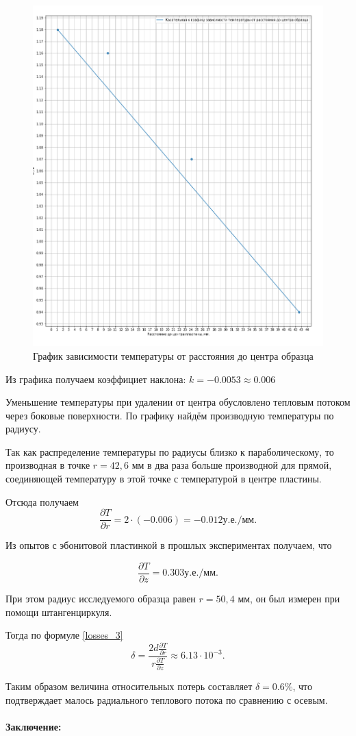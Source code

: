 \documentclass[a4paper, 12pt]{article}
\newcommand{\parag}[1]{\paragraph*{#1:}}
\begin{document}
\begin{figure}[h]
	\begin{center}
		\includegraphics[width=18cm]{u_to_r.png}
		\caption{График зависимости температуры от расстояния до центра образца}\label{img:gr2}
	\end{center}
\end{figure}

Из графика получаем коэффициет наклона: $k = -0.0053 \approx 0.006$

Уменьшение температуры при удалении от центра обусловлено тепловым потоком через боковые поверхности. По графику найдём производную температуры по радиусу.

Так как распределение температуры по радиусы близко к параболическому, то производная в точке $ r = 42,6 $ мм в два раза больше производной для прямой, соединяющей температуру в этой точке с температурой в центре пластины.

Отсюда получаем \[ \frac{\partial T}{\partial r} = 2 \cdot (-0.006) = -0.012  у.е./мм. \]

Из опытов с эбонитовой пластинкой в прошлых экспериментах получаем, что

\[ \frac{\partial T}{\partial z} = 0.303  у.е./мм. \]

При этом радиус исследуемого образца равен $r = 50,4 $ мм, он был измерен при помощи штангенциркуля.

Тогда по формуле \eqref{losses_3} \[ \delta = \frac{2d \frac{\partial T}{\partial r}}{r \frac{\partial T}{\partial z}}  \approx 6.13 \cdot 10^{-3}. \]

Таким образом величина относительных потерь составляет $ \delta = 0.6 \%$, что подтверждает малось радиального теплового потока по сравнению с осевым.


\parag {Заключение} ~\\
\end{document}
